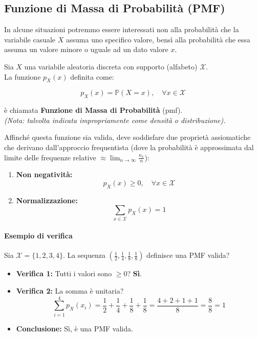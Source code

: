 \subsection{Funzione di Massa di Probabilità (PMF)}

In alcune situazioni potremmo essere interessati non alla probabilità che la variabile casuale $X$ assuma uno specifico valore, bensì alla probabilità che essa assuma un valore minore o uguale ad un dato valore $x$.

Sia $X$ una variabile aleatoria discreta con supporto (alfabeto) $\mathcal{X}$.
\\La funzione $p_X(x)$ definita come:

\begin{equation}
\boxed{p_X(x) = \mathbb{P}(X=x), \quad \forall x \in \mathcal{X}}
\end{equation}

è chiamata \textbf{Funzione di Massa di Probabilità} (pmf).
\\\textit{(Nota: talvolta indicata impropriamente come densità o distribuzione).}

Affinché questa funzione sia valida, deve soddisfare due proprietà assiomatiche che derivano dall'approccio frequentista (dove la probabilità è approssimata dal limite delle frequenze relative $\approx \lim_{n \to \infty} \frac{n_x}{n}$):

\begin{enumerate}
    \item \textbf{Non negatività:}
    \[ p_X(x) \ge 0, \quad \forall x \in \mathcal{X} \]
    
    \item \textbf{Normalizzazione:}
    \[ \sum_{x \in \mathcal{X}} p_X(x) = 1 \]
\end{enumerate}

\paragraph{Esempio di verifica}
Sia $\mathcal{X} = \{1, 2, 3, 4\}$. La sequenza $\left(\frac{1}{2}, \frac{1}{4}, \frac{1}{8}, \frac{1}{8}\right)$ definisce una PMF valida?

\begin{itemize}
    \item \textbf{Verifica 1:} Tutti i valori sono $\ge 0$? \textbf{Sì}.
    \item \textbf{Verifica 2:} La somma è unitaria?
    \[
    \sum_{i=1}^4 p_X(x_i) = \frac{1}{2} + \frac{1}{4} + \frac{1}{8} + \frac{1}{8} = \frac{4+2+1+1}{8} = \frac{8}{8} = 1
    \]
    \item \textbf{Conclusione:} Sì, è una PMF valida.
\end{itemize}

